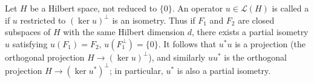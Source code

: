 Let $H$ be a Hilbert space, not reduced to $\{0\}$. An operator $u \in \mathcal{L}(H)$ is called a  if $u$ restricted to $(\ker u)^\perp$ is an isometry. Thus if $F_1$ and $F_2$ are closed subspaces of $H$ with the same Hilbert dimension $d$, there exists a partial isometry $u$ satisfying $u(F_1) = F_2$, $u(F_1^\perp) = \{0\}$. It follows that $u^*u$ is a projection (the orthogonal projection $H \to (\ker u)^\perp$), and similarly $uu^*$ is the orthogonal projection $H \to (\ker u^*)^\perp$; in particular, $u^*$ is also a partial isometry.
